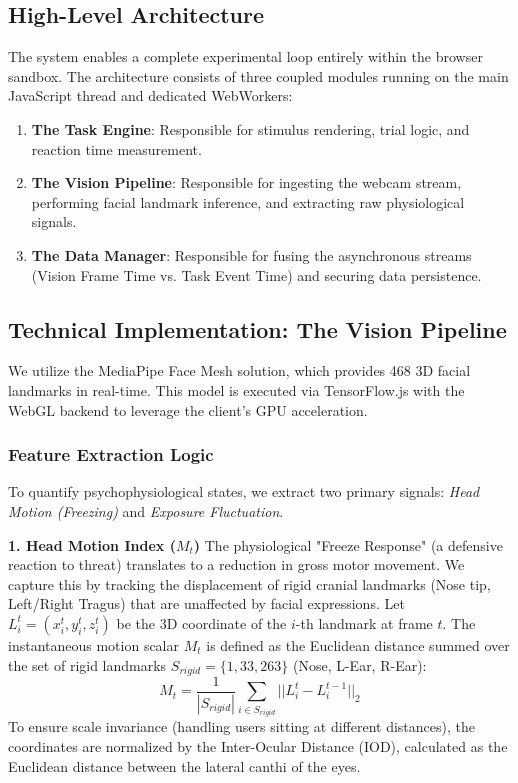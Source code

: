 \documentclass[journal]{IEEEtran}
\begin{document}
\subsection{High-Level Architecture}
The system enables a complete experimental loop entirely within the browser sandbox. The architecture consists of three coupled modules running on the main JavaScript thread and dedicated WebWorkers:
\begin{enumerate}
    \item \textbf{The Task Engine}: Responsible for stimulus rendering, trial logic, and reaction time measurement.
    \item \textbf{The Vision Pipeline}: Responsible for ingesting the webcam stream, performing facial landmark inference, and extracting raw physiological signals.
    \item \textbf{The Data Manager}: Responsible for fusing the asynchronous streams (Vision Frame Time vs. Task Event Time) and securing data persistence.
\end{enumerate}

\subsection{Technical Implementation: The Vision Pipeline}
We utilize the MediaPipe Face Mesh \cite{mediapipe_paper} solution, which provides 468 3D facial landmarks in real-time. This model is executed via TensorFlow.js with the WebGL backend to leverage the client's GPU acceleration.

\subsubsection{Feature Extraction Logic}
To quantify psychophysiological states, we extract two primary signals: \textit{Head Motion (Freezing)} and \textit{Exposure Fluctuation}.

\textbf{1. Head Motion Index ($M_t$)}
The physiological "Freeze Response" (a defensive reaction to threat) translates to a reduction in gross motor movement. We capture this by tracking the displacement of rigid cranial landmarks (Nose tip, Left/Right Tragus) that are unaffected by facial expressions.
Let $L_i^t = (x_i^t, y_i^t, z_i^t)$ be the 3D coordinate of the $i$-th landmark at frame $t$. The instantaneous motion scalar $M_t$ is defined as the Euclidean distance summed over the set of rigid landmarks $S_{rigid} = \{1, 33, 263\}$ (Nose, L-Ear, R-Ear):
\begin{equation}
    M_t = \frac{1}{|S_{rigid}|} \sum_{i \in S_{rigid}} || L_i^t - L_i^{t-1} ||_2
\end{equation}
To ensure scale invariance (handling users sitting at different distances), the coordinates are normalized by the Inter-Ocular Distance (IOD), calculated as the Euclidean distance between the lateral canthi of the eyes.
\end{document}
